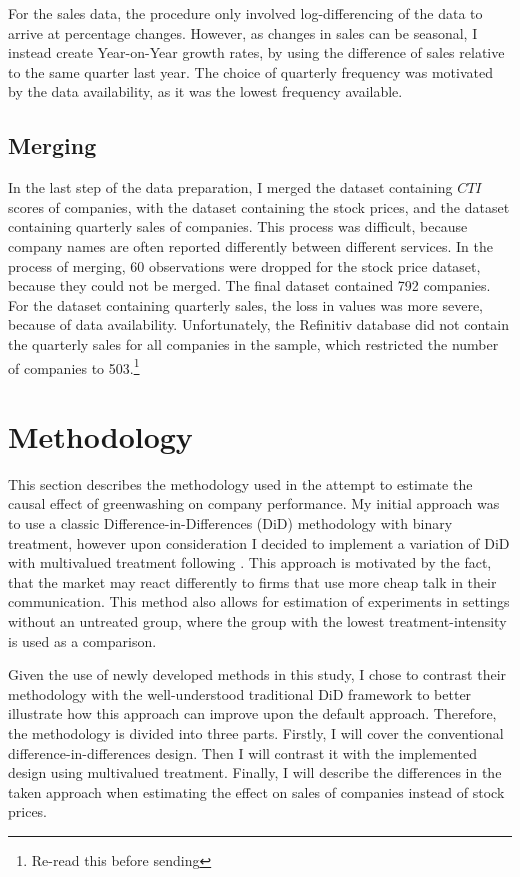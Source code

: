 \documentclass[12pt]{article}
\begin{document}
For the sales data, the procedure only involved log-differencing of the data to arrive at percentage changes. However, as changes in sales can be seasonal, I instead create Year-on-Year growth rates, by using the difference of sales relative to the same quarter last year. The choice of quarterly frequency was motivated by the data availability, as it was the lowest frequency available. 


\subsection{Merging}

In the last step of the data preparation, I merged the dataset containing $CTI$ scores of companies, with the dataset containing the stock prices, and the dataset containing quarterly sales of companies. This process was difficult, because company names are often reported differently between different services. In the process of merging, 60 observations were dropped for the stock price dataset, because they could not be merged. The final dataset contained 792 companies. For the dataset containing quarterly sales, the loss in values was more severe, because of data availability. Unfortunately, the Refinitiv database did not contain the quarterly sales for all companies in the sample, which restricted the number of companies to 503.\footnote{Re-read this before sending}


\section{Methodology}\label{sect:methodology}

This section describes the methodology used in the attempt to estimate the causal effect of greenwashing on company performance.
My initial approach was to use a classic Difference-in-Differences (DiD) methodology with binary treatment, however upon consideration I decided to implement a variation of DiD with multivalued treatment following \textcite{callawayDifferenceinDifferencesContinuousTreatment2025}. This approach is motivated by the fact, that the market may react differently to firms that use more cheap talk in their communication. This method also allows for estimation of experiments in settings without an untreated group, where the group with the lowest treatment-intensity is used as a comparison. 

Given the use of newly developed methods in this study, I chose to contrast their methodology with the well-understood traditional DiD framework to better illustrate how this approach can improve upon the default approach. Therefore, the methodology is divided into three parts. Firstly, I will cover the conventional difference-in-differences design. Then I will contrast it with the implemented design using multivalued treatment. Finally, I will describe the differences in the taken approach when estimating the effect on sales of companies instead of stock prices.
\end{document}
